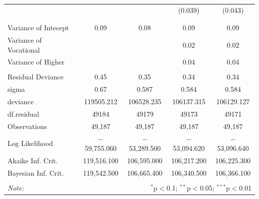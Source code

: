 \documentclass[alpha-refs]{wiley-article-03v}
\begin{document}
\begin{table}[!htbp]
\begin{tabular}{@{\extracolsep{5pt}}lcccc}
		&  &  & (0.039) & (0.043) \\ 
		& & & & \\ 
		\hline \\[-1.8ex] 
		Variance of Intecept & 0.09 & 0.08 & 0.09 & 0.09 \\ 
		Variance of Vocational &  &  & 0.02 & 0.02 \\ 
		Variance of Higher &  &  & 0.04 & 0.04 \\ 
		\hline \\
		Residual Deviance & 0.45 & 0.35 & 0.34 & 0.34 \\ 
		sigma & 0.67 & 0.587 & 0.584 & 0.584 \\ 
		deviance & 119505.212 & 106528.235 & 106137.315 & 106129.127 \\ 
		df.residual & 49184 & 49179 & 49173 & 49171 \\ 
		Observations & 49,187 & 49,187 & 49,187 & 49,187 \\ 
		Log Likelihood & $-$59,755.060 & $-$53,289.500 & $-$53,094.620 & $-$53,096.640 \\ 
		Akaike Inf. Crit. & 119,516.100 & 106,595.000 & 106,217.200 & 106,225.300 \\ 
		Bayesian Inf. Crit. & 119,542.500 & 106,665.400 & 106,340.500 & 106,366.100 \\ 
		\hline 
		\hline \\[-1.8ex] 
		\textit{Note:}  & \multicolumn{4}{r}{$^{*}$p$<$0.1; $^{**}$p$<$0.05; $^{***}$p$<$0.01} \\ 
	\end{tabular} 
\end{table} 


\newpage
\printbibliography
\end{document}
